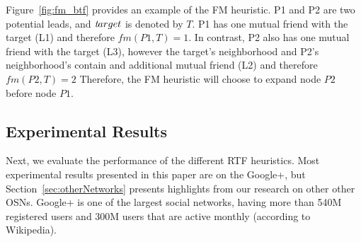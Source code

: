 \documentclass[journal]{IEEEtran}
\newcommand{\target}{{\textit target}}
\begin{document}
Figure~\ref{fig:fm_btf} provides an example of the FM heuristic. P1 and P2 are two potential leads, and $\target$ is denoted by $T$. P1 has one mutual friend with the target (L1) and therefore $fm(P1,T)=1$. In contrast, P2 also has one mutual friend with the target (L3), however the target's neighborhood and P2's neighborhood's contain and additional mutual friend (L2) and therefore $fm(P2,T)=2$
Therefore, the FM  heuristic will choose to expand node $P2$ before node $P1$.





\subsection{Experimental Results}
\label{sec:btf-experimentalResults}
Next, we evaluate the performance of the different RTF heuristics. Most experimental results presented in this paper are on the Google+, but Section~\ref{sec:otherNetworks} presents highlights from our research on other other OSNs. Google+ is one of the largest social networks, having more than 540M registered users and 300M users that are active monthly (according to Wikipedia). 



\end{document}

